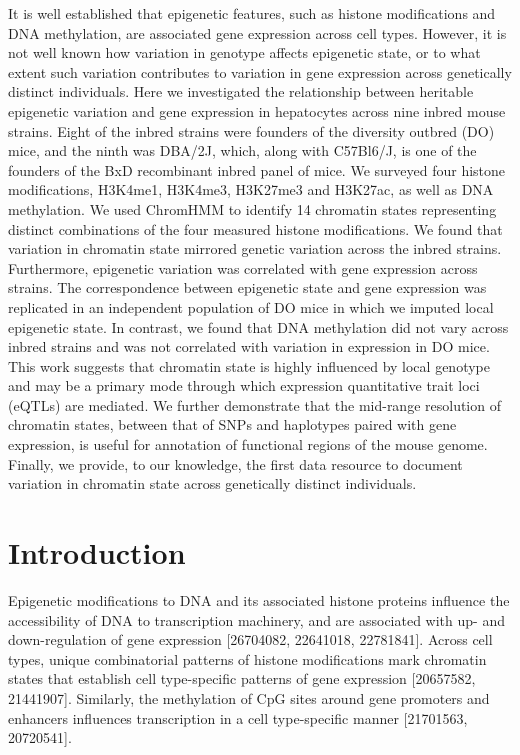 \documentclass[10pt,letterpaper]{article}
\begin{document}
It is well established that epigenetic features, such as histone
modifications and DNA methylation, are associated gene expression across
cell types. However, it is not well known how variation in genotype
affects epigenetic state, or to what extent such variation contributes
to variation in gene expression across genetically distinct individuals.
Here we investigated the relationship between heritable epigenetic
variation and gene expression in hepatocytes across nine inbred mouse
strains. Eight of the inbred strains were founders of the diversity
outbred (DO) mice, and the ninth was DBA/2J, which, along with C57Bl6/J,
is one of the founders of the BxD recombinant inbred panel of mice. We
surveyed four histone modifications, H3K4me1, H3K4me3, H3K27me3 and
H3K27ac, as well as DNA methylation. We used ChromHMM to identify 14
chromatin states representing distinct combinations of the four measured
histone modifications. We found that variation in chromatin state
mirrored genetic variation across the inbred strains. Furthermore,
epigenetic variation was correlated with gene expression across strains.
The correspondence between epigenetic state and gene expression was
replicated in an independent population of DO mice in which we imputed
local epigenetic state. In contrast, we found that DNA methylation did
not vary across inbred strains and was not correlated with variation in
expression in DO mice. This work suggests that chromatin state is highly
influenced by local genotype and may be a primary mode through which
expression quantitative trait loci (eQTLs) are mediated. We further
demonstrate that the mid-range resolution of chromatin states, between
that of SNPs and haplotypes paired with gene expression, is useful for
annotation of functional regions of the mouse genome. Finally, we
provide, to our knowledge, the first data resource to document variation
in chromatin state across genetically distinct individuals.

\hypertarget{introduction}{%
\section{Introduction}\label{introduction}}

Epigenetic modifications to DNA and its associated histone proteins
influence the accessibility of DNA to transcription machinery, and are
associated with up- and down-regulation of gene expression {[}26704082,
22641018, 22781841{]}. Across cell types, unique combinatorial patterns
of histone modifications mark chromatin states that establish cell
type-specific patterns of gene expression {[}20657582, 21441907{]}.
Similarly, the methylation of CpG sites around gene promoters and
enhancers influences transcription in a cell type-specific manner
{[}21701563, 20720541{]}.
\end{document}
